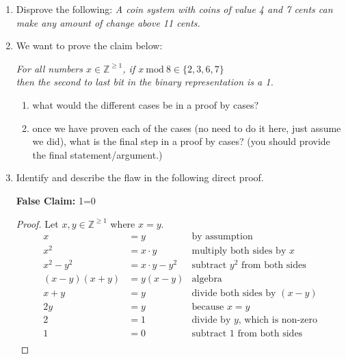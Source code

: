 \documentclass[11pt, oneside]{article}   	%
\newcommand{\ints}{\mathbb{Z}}
\renewcommand{\mod}{\ \mathrm{mod}\ }
\begin{document}
\begin{enumerate}
\item Disprove the following: \textit{A coin system with coins of value 4 and 7 cents can make any amount of change above 11 cents.}
\vspace{3em}



\clearpage
\item We want to prove the claim below:
\begin{center}
\textit{For all numbers $x\in\ints^{\ge1}$, if $x\mod 8 \in\{2,3,6,7\}$ \\
then the second to last bit in the binary representation is a 1.}
\end{center}
\begin{enumerate}
\item what would the different cases be in a proof by cases? \vspace{8em}
\item once we have proven each of the cases (no need to do it here, just assume we did), 
what is the final step in a proof by cases? (you should provide the final statement/argument.)\vspace{8em}
\end{enumerate}

\item Identify and describe the flaw in the following direct proof. 

\textbf{False Claim:} 1=0

\begin{proof}
Let $x, y \in \ints^{\ge1}$ where $x=y$.
\[
\begin{aligned}
x &= y & \text{by assumption}\\
x^2 &= x\cdot y & \text{multiply both sides by $x$}\\
x^2 - y^2 &= x\cdot y - y^2 & \text{subtract $y^2$ from both sides}\\ 
\left(x-y\right)\left(x+y\right) &= y \left(x-y\right) & \text{algebra}\\
x + y &= y & \text{divide both sides by $(x-y)$}\\
2 y &= y & \text{because $x=y$}\\
2 &= 1 & \text{divide by $y$, which is non-zero}\\
1 &= 0 & \text{subtract 1 from both sides}\\
\end{aligned}
\]
\end{proof}
\vspace{5em}

\end{enumerate}
\end{document}
